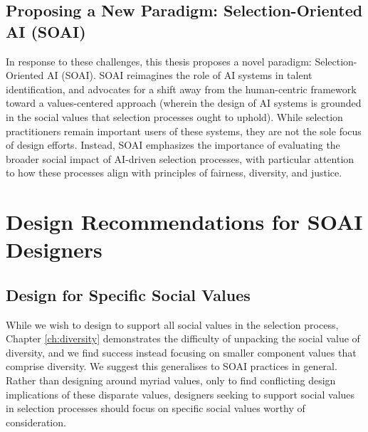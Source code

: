\subsection{Proposing a New Paradigm: Selection-Oriented AI (SOAI)}
In response to these challenges, this thesis proposes a novel paradigm: Selection-Oriented AI (SOAI). SOAI reimagines the role of AI systems in talent identification, and advocates for a shift away from the human-centric framework toward a values-centered approach (wherein the design of AI systems is grounded in the social values that selection processes ought to uphold). While selection practitioners remain important users of these systems, they are not the sole focus of design efforts. Instead, SOAI emphasizes the importance of evaluating the broader social impact of AI-driven selection processes, with particular attention to how these processes align with principles of fairness, diversity, and justice. %




\section{Design Recommendations for SOAI Designers}
\subsection{Design for Specific Social Values}
While we wish to design to support all social values in the selection process, Chapter \ref{ch:diversity} demonstrates the difficulty of unpacking the social value of diversity, and we find success instead focusing on smaller component values that comprise diversity. We suggest this generalises to SOAI practices in general. Rather than designing around myriad values, only to find conflicting design implications of these disparate values, designers seeking to support social values in selection processes should focus on specific social values worthy of consideration.

